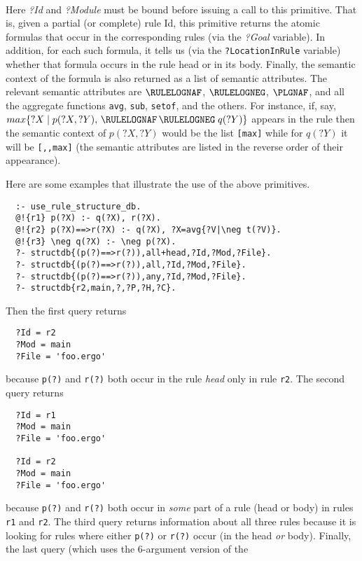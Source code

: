 \begin{itemize}
{    }
    \\
    Here \emph{?Id} and \emph{?Module} must
    be bound before issuing a call to this primitive. That is, given a
    partial (or complete) rule Id, this primitive returns the atomic
    formulas that occur in the corresponding rules (via the \emph{?Goal}
    variable).
    In addition, for each such formula, it tells us (via the
    \texttt{?LocationInRule} variable) whether that formula occurs in the
    rule head or in its body. Finally, the semantic context of the formula
    is also returned as a list of semantic attributes.
    The relevant semantic attributes are $\RULELOGNAF$, $\RULELOGNEG$,
    $\PLGNAF$, and all the aggregate functions \texttt{avg}, \texttt{sub},
    \texttt{setof}, and the others.   
    For instance, if, say, $max\{?X\mid p(?X,?Y),\, \RULELOGNAF\, \RULELOGNEG \;q(?Y)\}$
    appears in the rule then the semantic context of $p(?X,?Y)$ would be
    the list \texttt{[max]} while for $q(?Y)$  it will be
    \texttt{[\RULELOGNEG,\RULELOGNAF,max]} (the semantic attributes are
    listed in the reverse order of their appearance). 
\end{itemize}
Here are some examples that illustrate the use of the above primitives.
\begin{verbatim}
  :- use_rule_structure_db.
  @!{r1} p(?X) :- q(?X), r(?X).
  @!{r2} p(?X)==>r(?X) :- q(?X), ?X=avg{?V|\neg t(?V)}.
  @!{r3} \neg q(?X) :- \neg p(?X).
  ?- structdb{(p(?)==>r(?)),all+head,?Id,?Mod,?File}.
  ?- structdb{(p(?)==>r(?)),all,?Id,?Mod,?File}.
  ?- structdb{(p(?)==>r(?)),any,?Id,?Mod,?File}.
  ?- structdb{r2,main,?,?P,?H,?C}.
\end{verbatim}
Then the first query returns
\begin{verbatim}
  ?Id = r2
  ?Mod = main
  ?File = 'foo.ergo'
\end{verbatim}
because \texttt{p(?)} and \texttt{r(?)} both occur in the rule \emph{head}
only in rule \texttt{r2}. The second query returns 
\begin{verbatim}
  ?Id = r1
  ?Mod = main
  ?File = 'foo.ergo'

  ?Id = r2
  ?Mod = main
  ?File = 'foo.ergo'
\end{verbatim}
because \texttt{p(?)} and \texttt{r(?)} both occur in \emph{some} part of a
rule (head or body) in rules \texttt{r1} and \texttt{r2}. The third query   
returns information about all three rules because it is looking for rules
where either \texttt{p(?)} or \texttt{r(?)} occur (in the head \emph{or}
body). 
Finally, the last query (which uses the 6-argument version of the
